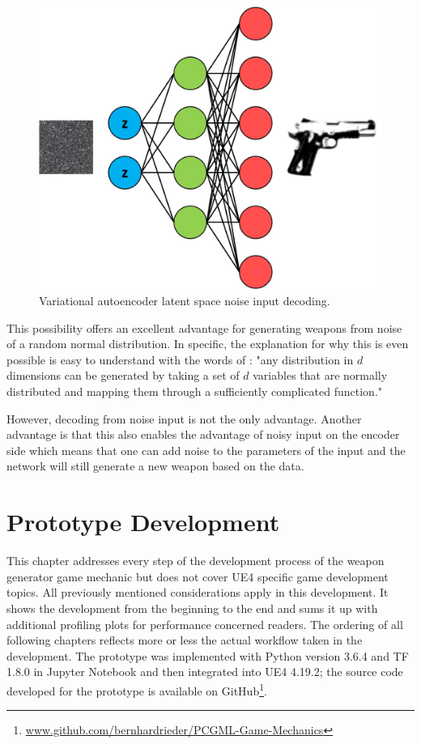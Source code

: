 \documentclass[MGS,Master,english]{twbook}%
\begin{document}
\begin{figure}[!htbp]
	\centering
	\includegraphics[width=0.7\linewidth]{PICs/NNs/variational_autoencoder_noise_decoding}
	\caption{Variational autoencoder latent space noise input decoding.} \label{fig::vae_noise_decoding}
\end{figure}

This possibility offers an excellent advantage for generating weapons from noise of a random normal distribution. In specific, the explanation for why this is even possible is easy to understand with the words of \citep{ml::vae::tutorial}: "any distribution in $d$ dimensions can be generated by taking a set of $d$ variables that are normally distributed and mapping them through a sufficiently complicated function."

However, decoding from noise input is not the only advantage. Another advantage is that this also enables the advantage of noisy input on the encoder side which means that one can add noise to the parameters of the input and the network will still generate a new weapon based on the data. 


%
%
\clearpage
\chapter{Prototype Development}
This chapter addresses every step of the development process of the weapon generator game mechanic but does not cover UE4 specific game development topics. All previously mentioned considerations apply in this development. It shows the development from the beginning to the end and sums it up with additional profiling plots for performance concerned readers. The ordering of all following chapters reflects more or less the actual workflow taken in the development. The prototype was implemented with Python version 3.6.4 and TF 1.8.0 in Jupyter Notebook and then integrated into UE4 4.19.2; the source code developed for the prototype is available on GitHub\footnote{\url{www.github.com/bernhardrieder/PCGML-Game-Mechanics}}. 
\end{document}

